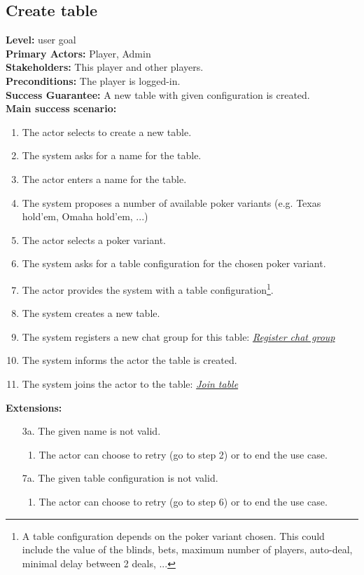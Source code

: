 \documentclass[a4paper,11pt]{report}
\begin{document}
\subsection{Create table}
\textbf{Level:} user goal \\
\textbf{Primary Actors:} Player, Admin \\
\textbf{Stakeholders:} This player and other players.\\
\textbf{Preconditions:} The player is logged-in.\\
\textbf{Success Guarantee:} A new table with given configuration is created. \\
\textbf{Main success scenario:} 
\begin{enumerate}
\item The actor selects to create a new table.
\item The system asks for a name for the table.
\item The actor enters a name for the table.
\item The system proposes a number of available poker variants (e.g. Texas hold'em, Omaha hold'em, ...)
\item The actor selects a poker variant. 
\item The system asks for a table configuration for the chosen poker variant.
\item The actor provides the system with a table configuration\footnote{A table configuration depends on the poker variant chosen. This could include the value of the blinds, bets, maximum number of players, auto-deal, minimal delay between 2 deals, ...}.
\item The system creates a new table. 
\item The system registers a new chat group for this table: \emph{\underline{Register chat group}}
\item The system informs the actor the table is created.
\item The system joins the actor to the table:  \emph{\underline{Join table}}
\end{enumerate}
\textbf{Extensions:}
\begin{itemize}
\item[3a.] The given name is not valid.
\begin{enumerate}
\item The actor can choose to retry (go to step 2) or to end the use case. 
\end{enumerate}
\item[7a.] The given table configuration is not valid. 
\begin{enumerate}
\item The actor can choose to retry (go to step 6) or to end the use case. 
\end{enumerate}
\end{itemize}
\end{document}

